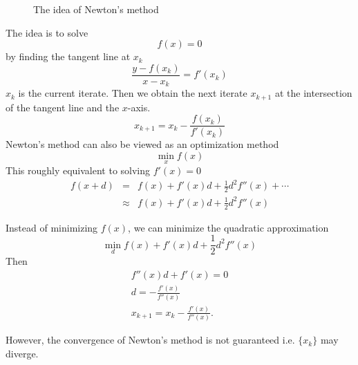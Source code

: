 \begin{figure}
    \centering
    \caption{The idea of Newton's method}
\end{figure}

The idea is to solve \[
    f(x) = 0
\]
by finding the tangent line at $x_k$ \[
    \frac{y - f(x_k)}{x - x_k} = f'(x_k)
\]
$x_k$ is the current iterate.
Then we obtain the next iterate $x_{k+1}$ at the intersection of the tangent line and the $x$-axis.
\[
    x_{k+1} = x_k - \frac{f(x_k)}{f'(x_k)}
\]
Newton's method can also be viewed as an optimization method \[
    \min_{x} f(x)
\]
This roughly equivalent to solving $f'(x) = 0$ 
\begin{eqnarray*}
f(x + d)  & = & f(x) + f'(x)d + \frac{1}{2}
d^2 f''(x) + \cdots \\
&\approx &   f(x) + f'(x)d + \frac{1}{2}
d^2 f''(x) 
\end{eqnarray*}

Instead of minimizing $f(x)$, we can minimize the quadratic approximation \[
    \min_{d} f(x) + f'(x)d + \frac{1}{2} d^2 f''(x)
\]
Then 
\begin{gather*}
f''(x) d + f'(x) = 0 \\
d = -\frac{f'(x)}{f''(x)} \\
x_{k+1} = x_k -\frac{f'(x)}{f''(x)}. 
\end{gather*}

However, the convergence of Newton's method is not guaranteed i.e. $\{x_k\}$ may diverge.

